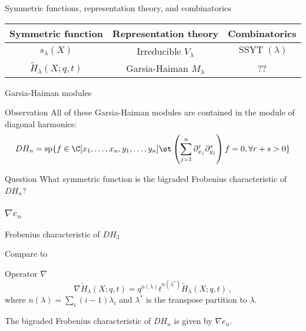 \documentclass[dvipsnames]{beamer}
\newcommand{\Htild}{\tilde{H}}
\renewcommand{\Span}{\operatorname{sp}}
\DeclareMathOperator{\SSYT}{SSYT}
\theoremstyle{definition}
\newcounter{c}
\begin{document}
  \begin{frame}{Symmetric functions, representation theory, and combinatorics}
    \begin{tabular}{ccc}
      Symmetric function & Representation theory & Combinatorics 
      \\
      \hline
      \(s_\lambda(X)\) & Irreducible \(V_\lambda\) & \(\SSYT(\lambda)\) \\
      \(\Htild_\lambda(X;q,t)\) & Garsia-Haiman \(M_\lambda\) & ??
    \end{tabular}
  \end{frame}
  \begin{frame}{Garsia-Haiman modules}
  \begin{block}{Observation}
    All of these Garsia-Haiman modules are contained in the module of
    diagonal harmonics:  \[
      DH_n = \Span\{ f \in \C[x_1,\ldots,x_n,y_1,\ldots,y_n] \st
      \left(\sum_{j=1}^n \partial_{x_j}^r \partial_{y_j}^s\right) f = 0, \forall r+s>0\}
    \]
  \end{block}\pause
  \begin{block}{Question}
    What symmetric function is the bigraded Frobenius characteristic
    of \(DH_n\)?
  \end{block}
\end{frame}
\begin{frame}
  \frametitle{\(\nabla e_n\)}
  Frobenius characteristic of \(DH_3\)\pause
  \begin{center}
    \pause
\end{center}
Compare to  
\begin{center}
  \end{center}\pause
  \begin{block}{Operator \(\nabla\)}
    \[
      \nabla \tilde{H}_\lambda(X;q,t) = q^{n(\lambda)} t^{n(\lambda^*)} \tilde{H}_\lambda(X;q,t)\,,
    \]
    where $n(\lambda) = \sum _{i} (i-1)\lambda_{i}$ and \(\lambda^*\)
    is the transpose partition to \(\lambda\).
  \end{block}\pause
  \begin{theorem}[Haiman, 2002]
    The bigraded Frobenius characteristic of \(DH_n\) is given by \(\nabla e_n\).
  \end{theorem}
\end{frame}
\end{document}

